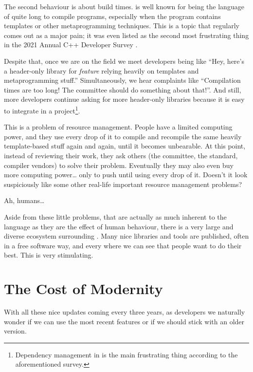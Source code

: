 The second behaviour is about build times. \Cpp{} is well known for
being the language of quite long to compile programs, especially when
the program contains templates or other metaprogramming
techniques. This is a topic that regularly comes out as a major pain;
it was even listed as the second most frustrating thing in the 2021
Annual C++ Developer Survey
\cite{2021-annual-cpp-developer-survey}.

Despite that, once we are on the field we meet developers being like
``Hey, here's a header-only library for {\em feature} relying heavily
on templates and metaprogramming stuff.'' Simultaneously, we hear
complaints like ``Compilation times are too long! The committee should
do something about that!''. And still, more developers continue asking
for more header-only libraries because it is easy to integrate in a
project\footnote{Dependency management in \cpp{} is the main
  frustrating thing according to the aforementioned survey.}.

This is a problem of resource management. People have a limited
computing power, and they use every drop of it to compile and
recompile the same heavily template-based stuff again and again, until
it becomes unbearable. At this point, instead of reviewing their work,
they ask others (the committee, the standard, compiler vendors) to
solve their problem. Eventually they may also even buy more computing
power… only to push until using every drop of it. Doesn't it look
suspiciously like some other real-life important resource management
problems?

Ah, humans…

\bigskip

Aside from these little problems, that are actually as much inherent
to the language as they are the effect of human behaviour, there is a
very large and diverse ecosystem surrounding \cpp. Many nice libraries
and tools are published, often in a free software way, and every where
we can see that people want to do their best. This is very
stimulating.

\section{The Cost of Modernity}

With all these nice updates coming every three years, as \cpp{}
developers we naturally wonder if we can use the most recent features
or if we should stick with an older version.

